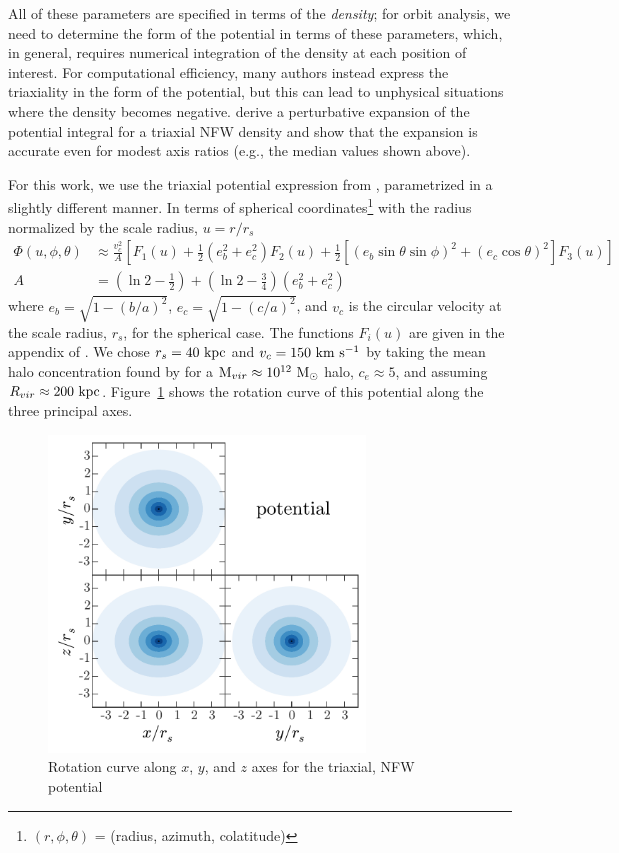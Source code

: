 \documentclass[letterpaper,12pt,preprint]{aastex}
\newcommand{\msun}{\mathrm{M}_\odot}
\begin{document}
All of these parameters are specified in terms of the \emph{density}; for orbit analysis, we need to determine the form of the potential in terms of these parameters, which, in general, requires numerical integration of the density at each position of interest. For computational efficiency, many authors instead express the triaxiality in the form of the potential, but this can lead to unphysical situations where the density becomes negative. \citet{leesuto03} derive a perturbative expansion of the potential integral for a triaxial NFW density and show that the expansion is accurate even for modest axis ratios (e.g., the median values shown above). 

For this work, we use the triaxial potential expression from \citet{leesuto03}, parametrized in a slightly different manner. In terms of spherical coordinates\footnote{$(r,\phi,\theta)$ = (radius, azimuth, colatitude)} with the radius normalized by the scale radius, $u = r/r_s$
\begin{align}
	\Phi(u,\phi,\theta) &\approx \frac{v_c^2}{A}\left[F_1(u) + \frac{1}{2}(e_b^2 + e_c^2)F_2(u) + \frac{1}{2} [(e_b\sin\theta \sin\phi)^2 + (e_c\cos\theta)^2] F_3(u) \right]\\
	A &= \left(\ln2 - \frac{1}{2}\right) + \left(\ln2-\frac{3}{4}\right) (e_b^2 + e_c^2)
\end{align}
where $e_b = \sqrt{1 - (b/a)^2}$, $e_c = \sqrt{1 - (c/a)^2}$, and $v_c$ is the circular velocity at the scale radius, $r_s$, for the spherical case. The functions $F_i(u)$ are given in the appendix of \cite{leesuto03}. We chose $r_s=40~{\rm kpc}$ and $v_c = 150~{\rm km}~{\rm s}^{-1}$ by taking the mean halo concentration found by \cite{jing02} for a ${\rm M}_{vir} \approx 10^{12}~\msun$ halo, $c_e\approx5$, and assuming $R_{vir}\approx200~{\rm kpc}$. Figure~\ref{fig:potential} shows the rotation curve of this potential along the three principal axes.

\begin{figure}[!h]
\begin{center}
\includegraphics[width=0.75\textwidth]{figures/potential.pdf}
\caption{Rotation curve along $x$, $y$, and $z$ axes for the triaxial, NFW potential } \label{fig:potential}
\end{center}
\end{figure}
\end{document}

